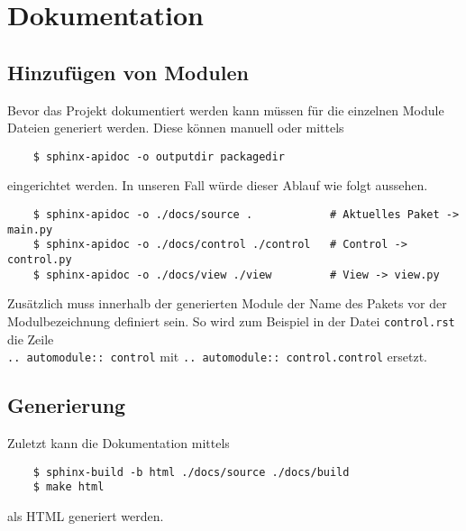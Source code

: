 \documentclass[a4paper,11pt]{article}
\begin{document}
\section{Dokumentation}
\subsection{Hinzufügen von Modulen}
Bevor das Projekt dokumentiert werden kann müssen für die einzelnen Module Dateien generiert werden.
Diese können manuell oder mittels
\begin{verbatim}
    $ sphinx-apidoc -o outputdir packagedir
\end{verbatim}
eingerichtet werden. In unseren Fall würde dieser Ablauf wie folgt aussehen.
\begin{verbatim}
    $ sphinx-apidoc -o ./docs/source .            # Aktuelles Paket -> main.py
    $ sphinx-apidoc -o ./docs/control ./control   # Control -> control.py
    $ sphinx-apidoc -o ./docs/view ./view         # View -> view.py
\end{verbatim}
Zusätzlich muss innerhalb der generierten Module der Name des Pakets vor der Modulbezeichnung definiert sein.
So wird zum Beispiel in der Datei \texttt{control.rst} die Zeile \\
\texttt{.. automodule:: control} mit \texttt{.. automodule:: control.control} ersetzt.

\subsection{Generierung}
Zuletzt kann die Dokumentation mittels
\begin{verbatim}
    $ sphinx-build -b html ./docs/source ./docs/build
    $ make html
\end{verbatim}
als HTML generiert werden.
\end{document}
